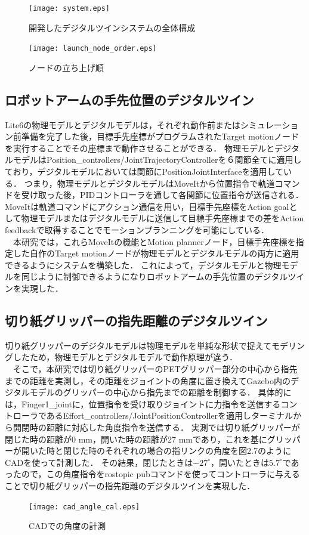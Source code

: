 \begin{figure}[htbt]
	\centering
	 \texttt{[image: system.eps]}
	 \caption{開発したデジタルツインシステムの全体構成}
	 \label{fig:f2}
\end{figure}

\begin{figure}[htbt]
	\centering
	 \texttt{[image: launch\_node\_order.eps]}
	 \caption{ノードの立ち上げ順}
	 \label{fig:f2}
\end{figure}

\subsection{ロボットアームの手先位置のデジタルツイン}
Lite6の物理モデルとデジタルモデルは，それぞれ動作前またはシミュレーション前準備を完了した後，目標手先座標がプログラムされたTarget motionノードを実行することでその座標まで動作させることができる．
物理モデルとデジタルモデルはPosition\_controllers/JointTrajectoryControllerを６関節全てに適用しており，デジタルモデルにおいては関節にPositionJointInterfaceを適用している．
つまり，物理モデルとデジタルモデルはMoveItから位置指令で軌道コマンドを受け取った後，PIDコントローラを通して各関節に位置指令が送信される．
MoveItは軌道コマンドにアクション通信を用い，目標手先座標をAction goalとして物理モデルまたはデジタルモデルに送信して目標手先座標までの差をAction feedbackで取得することでモーションプランニングを可能にしている．\\
　本研究では，これらMoveItの機能とMotion plannerノード，目標手先座標を指定した自作のTarget motionノードが物理モデルとデジタルモデルの両方に適用できるようにシステムを構築した．
これによって，デジタルモデルと物理モデルを同じように制御できるようになりロボットアームの手先位置のデジタルツインを実現した．

\subsection{切り紙グリッパーの指先距離のデジタルツイン}
切り紙グリッパーのデジタルモデルは物理モデルを単純な形状で捉えてモデリングしたため，物理モデルとデジタルモデルで動作原理が違う．\\
　そこで，本研究では切り紙グリッパーのPETグリッパー部分の中心から指先までの距離を実測し，その距離をジョイントの角度に置き換えてGazebo内のデジタルモデルのグリッパーの中心から指先までの距離を制御する．
具体的には，Finger1\_jointに，位置指令を受け取りジョイントに力指令を送信するコントローラであるEffort\_controllers/JointPositionControllerを適用しターミナルから開閉時の距離に対応した角度指令を送信する．
実測では切り紙グリッパーが閉じた時の距離が0 mm，開いた時の距離が27 mmであり，これを基にグリッパーが開いた時と閉じた時のそれぞれの場合の指リンクの角度を図2.7のようにCADを使って計測した．
その結果，閉じたときは$-27^\circ$，開いたときは$5.7^\circ$であったので，この角度指令をrostopic pubコマンドを使ってコントローラに与えることで切り紙グリッパーの指先距離のデジタルツインを実現した．

\begin{figure}[htbt]
	\centering
	 \texttt{[image: cad\_angle\_cal.eps]}
	 \caption{CADでの角度の計測}
	 \label{fig:f2}
\end{figure}
